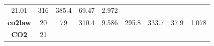 \documentclass[]{article}
\theoremstyle{definition}
\theoremstyle{definition}
\theoremstyle{definition}
\theoremstyle{remark}
\begin{document}
\begin{longtable}[]{@{}ccccccccc@{}}
\begin{minipage}[t]{0.08\columnwidth}
21.01\strut
\end{minipage} & \begin{minipage}[t]{0.08\columnwidth}\centering\strut
316\strut
\end{minipage} & \begin{minipage}[t]{0.07\columnwidth}\centering\strut
385.4\strut
\end{minipage} & \begin{minipage}[t]{0.07\columnwidth}\centering\strut
69.47\strut
\end{minipage} & \begin{minipage}[t]{0.08\columnwidth}\centering\strut
2.972\strut
\end{minipage}\tabularnewline
\begin{minipage}[t]{0.14\columnwidth}\centering\strut
\textbf{co2law}\strut
\end{minipage} & \begin{minipage}[t]{0.06\columnwidth}\centering\strut
20\strut
\end{minipage} & \begin{minipage}[t]{0.05\columnwidth}\centering\strut
79\strut
\end{minipage} & \begin{minipage}[t]{0.11\columnwidth}\centering\strut
310.4\strut
\end{minipage} & \begin{minipage}[t]{0.08\columnwidth}\centering\strut
9.586\strut
\end{minipage} & \begin{minipage}[t]{0.08\columnwidth}\centering\strut
295.8\strut
\end{minipage} & \begin{minipage}[t]{0.07\columnwidth}\centering\strut
333.7\strut
\end{minipage} & \begin{minipage}[t]{0.07\columnwidth}\centering\strut
37.9\strut
\end{minipage} & \begin{minipage}[t]{0.08\columnwidth}\centering\strut
1.078\strut
\end{minipage}\tabularnewline
\begin{minipage}[t]{0.14\columnwidth}\centering\strut
\textbf{CO2}\strut
\end{minipage} & \begin{minipage}[t]{0.06\columnwidth}\centering\strut
21\strut
\end{minipage} & \begin{minipage}[t]{0.05\columnwidth}\centering\strut

\end{minipage}
\end{longtable}
\end{document}
